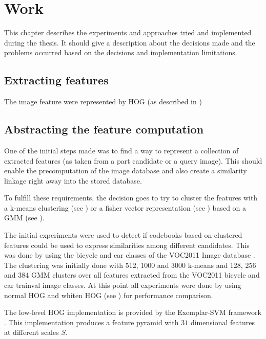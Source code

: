 \chapter{Work}
\label{cha:work}

This chapter describes the experiments and approaches tried and implemented during the thesis. It should give a description about the decisions made and the problems occurred based on the decisions and implementation limitations.

\section{Extracting features}

The image feature were represented by \acf{HOG} (as described in )

\section{Abstracting the feature computation}

One of the initial steps made was to find a way to represent a collection of extracted features (as taken from a part candidate or a query image). This should enable the precomputation of the image database and also create a similarity linkage right away into the stored database.

To fulfill these requirements, the decision goes to try to cluster the features with a k-means clustering (see ) or a fisher vector representation (see ) based on a \acf{GMM} (see ).
\par
The initial experiments were used to detect if codebooks based on clustered features could be used to express similarities among different candidates. This was done by using the bicycle and car classes of the \ac{VOC2011} Image database \cite{Pascal2011}.
The clustering was initially done with 512, 1000 and 3000 k-means and 128, 256 and 384 \ac{GMM} clusters over all features extracted from the \ac{VOC2011} bicycle and car trainval image classes.
At this point all experiments were done by using normal \ac{HOG} and whiten \ac{HOG} (see ) for performance comparison.
\par
The low-level \ac{HOG} implementation is provided by the Exemplar-SVM framework \cite{Malisiewicz2011}. This implementation produces a feature pyramid with $31$ dimensional features at different scales $S$.

